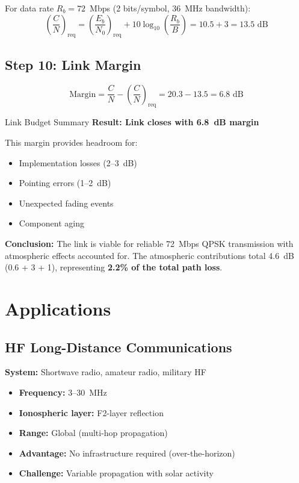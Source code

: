 For data rate $R_b = 72$~Mbps (2 bits/symbol, 36~MHz bandwidth):
\begin{equation}
\left(\frac{C}{N}\right)_{\text{req}} = \left(\frac{E_b}{N_0}\right)_{\text{req}} + 10\log_{10}\left(\frac{R_b}{B}\right) = 10.5 + 3 = 13.5\text{~dB}
\end{equation}

\subsection*{Step 10: Link Margin}

\begin{equation}
\text{Margin} = \frac{C}{N} - \left(\frac{C}{N}\right)_{\text{req}} = 20.3 - 13.5 = 6.8\text{~dB}
\end{equation}

\begin{calloutbox}[colback=black!8!white,colframe=black]{Link Budget Summary}
\textbf{Result: Link closes with 6.8~dB margin}

This margin provides headroom for:
\begin{itemize}
\item Implementation losses (2--3~dB)
\item Pointing errors (1--2~dB)
\item Unexpected fading events
\item Component aging
\end{itemize}

\textbf{Conclusion:} The link is viable for reliable 72~Mbps QPSK transmission with atmospheric effects accounted for. The atmospheric contributions total 4.6~dB (0.6 + 3 + 1), representing \textbf{2.2\% of the total path loss}.
\end{calloutbox}



\section{Applications}

\subsection{HF Long-Distance Communications}

\textbf{System:} Shortwave radio, amateur radio, military HF
\begin{itemize}
\item \textbf{Frequency:} 3--30~MHz
\item \textbf{Ionospheric layer:} F2-layer reflection
\item \textbf{Range:} Global (multi-hop propagation)
\item \textbf{Advantage:} No infrastructure required (over-the-horizon)
\item \textbf{Challenge:} Variable propagation with solar activity
\end{itemize}

